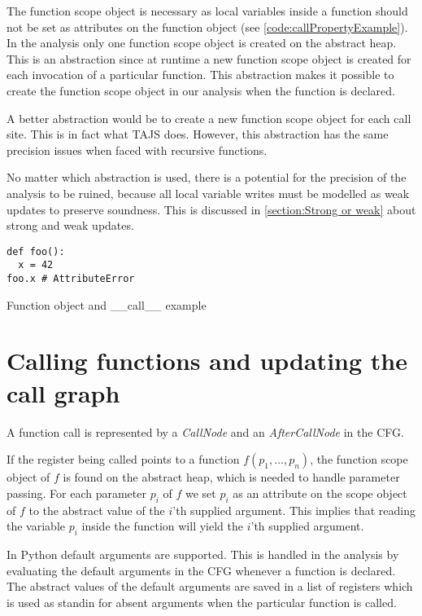 The function scope object is necessary as local variables inside a function should not be set as attributes on the function object (see \autoref{code:callPropertyExample}). In the analysis only one function scope object is created on the abstract heap. This is an abstraction since at runtime a new function scope object is created for each invocation of a particular function. This abstraction makes it possible to create the function scope object in our analysis when the function is declared.

A better abstraction would be to create a new function scope object for each call site. This is in fact what TAJS \cite{tajs} does. However, this abstraction has the same precision issues when faced with recursive functions.

No matter which abstraction is used, there is a potential for the precision of the analysis to be ruined, because all local variable writes must be modelled as weak updates to preserve soundness. This is discussed in \autoref{section:Strong or weak} about strong and weak updates.

\begin{listing}[H]
	\begin{verbatim}
def foo(): 
  x = 42
foo.x # AttributeError
	\end{verbatim}
\caption{Function object and \_\_call\_\_ example}
\label{code:callPropertyExample}
\end{listing}

\newpage

\section{Calling functions and updating the call graph}
A function call is represented by a \textit{CallNode} and an \textit{AfterCallNode} in the CFG.

If the register being called points to a function $f(p_1, ..., p_n)$, the function scope object of $f$ is found on the abstract heap, which is needed to handle parameter passing. For each parameter $p_i$ of $f$ we set $p_i$ as an attribute on the scope object of $f$ to the abstract value of the $i$'th supplied argument. This implies that reading the variable $p_i$ inside the function will yield the $i$'th supplied argument. 

In Python default arguments are supported. This is handled in the analysis by evaluating the default arguments in the CFG whenever a function is declared. The abstract values of the default arguments are saved in a list of registers which is used as standin for absent arguments when the particular function is called.

